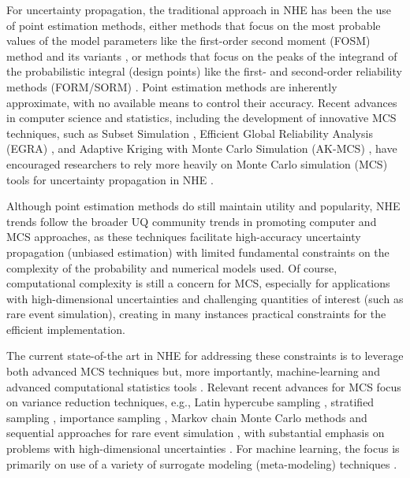 For uncertainty propagation, the traditional approach in NHE has been the use of point estimation methods, either methods that focus on the most probable values of the model parameters like the first-order second moment (FOSM) method \citep{baker2008uncertainty} and its variants \citep{vamvatsikos2013derivation}, or methods that focus on the peaks of the integrand of the probabilistic integral (design points) like the first- and second-order reliability methods (FORM/SORM) \citep{koduru2010feasibility}. Point estimation methods are inherently approximate, with no available means to control their accuracy. Recent advances in computer science and statistics, including the development of innovative MCS techniques, such as Subset Simulation \citep{au2003subset}, Efficient Global Reliability Analysis (EGRA) \citep{bichon2013efficient}, and Adaptive Kriging with Monte Carlo Simulation (AK-MCS) \citep{echard2011akmcs}, have encouraged researchers to rely more heavily on Monte Carlo simulation (MCS) tools for uncertainty propagation in NHE \citep{smith2011monte, taflanidis2011simulationbased, vamvatsikos2014seismic, esposito2015simulation, deb2019parametric}. 

Although point estimation methods do still maintain utility and popularity, NHE trends follow the broader UQ community trends in promoting computer and MCS approaches, as these techniques facilitate high-accuracy uncertainty propagation (unbiased estimation) with limited fundamental constraints on the complexity of the probability and numerical models used. Of course, computational complexity is still a concern for MCS, especially for applications with high-dimensional uncertainties and challenging quantities of interest (such as rare event simulation), creating in many instances practical constraints for the efficient implementation.

The current state-of-the art in NHE for addressing these constraints is to leverage both advanced MCS techniques \citep{au2003subset, li2017system, bansal2018subset} but, more importantly, machine-learning and advanced computational statistics tools \citep{echard2011akmcs, abbiati2017hierarchical, ding2018multifidelity, su2018efficient, wang2018bayesian}. Relevant recent advances for MCS focus on variance reduction techniques, e.g., Latin hypercube sampling \citep{vamvatsikos2014seismic}, stratified sampling \citep{jayaram2010efficient}, importance sampling \citep{papaioannou2018reliability}, Markov chain Monte Carlo methods \citep{au2003subset} and sequential approaches for rare event simulation \citep{jia2017new}, with substantial emphasis on problems with high-dimensional uncertainties \citep{au2003subset, wang2016crossentropybased}. For machine learning, the focus is primarily on use of a variety of surrogate modeling (meta-modeling) techniques \citep{stern2017accelerated, zhang2018adaptive, bernier2019fragility, gentile2020gaussian, le2020neural, zhang2020physicsguided}.

